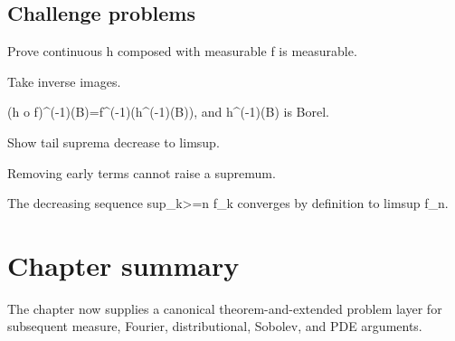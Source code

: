 \subsection*{Challenge problems}

\begin{exercise}[Composition]\label{exr:iii02-expand-15}
Prove continuous h composed with measurable f is measurable.
\end{exercise}
\begin{hint}
Take inverse images.
\end{hint}
\begin{solution}
(h o f)\textasciicircum{}(-1)(B)=f\textasciicircum{}(-1)(h\textasciicircum{}(-1)(B)), and h\textasciicircum{}(-1)(B) is Borel.
\end{solution}

\begin{exercise}\label{exr:iii02-expand-16}
Show tail suprema decrease to limsup.
\end{exercise}
\begin{hint}
Removing early terms cannot raise a supremum.
\end{hint}
\begin{solution}
The decreasing sequence sup\_{k>=n} f\_k converges by definition to limsup f\_n.
\end{solution}
\section*{Chapter summary}
The chapter now supplies a canonical theorem-and-extended problem layer for subsequent measure, Fourier, distributional, Sobolev, and PDE arguments.
